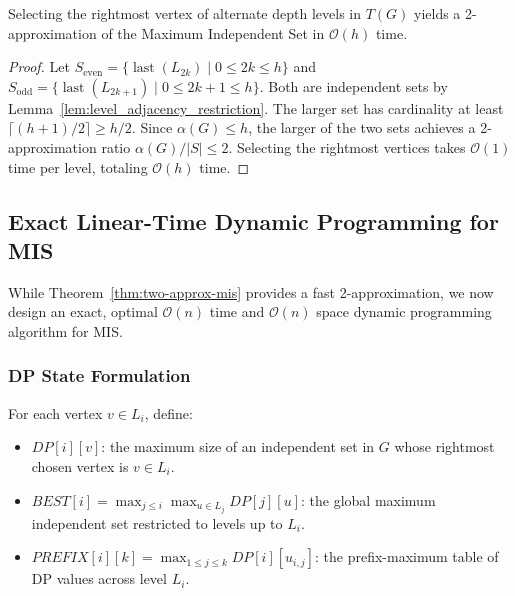 \begin{theorem}
\label{thm:two-approx-mis}
Selecting the rightmost vertex of alternate depth levels in $T(G)$ yields a 2-approximation of the Maximum Independent Set in $\mathcal{O}(h)$ time.
\end{theorem}
\begin{proof}
Let $S_{\text{even}} = \{ \operatorname{last}(L_{2k}) \mid 0 \le 2k \le h \}$ and $S_{\text{odd}} = \{ \operatorname{last}(L_{2k+1}) \mid 0 \le 2k+1 \le h \}$. Both are independent sets by Lemma~\ref{lem:level_adjacency_restriction}. The larger set has cardinality at least $\lceil (h+1)/2 \rceil \ge h/2$. Since $\alpha(G) \le h$, the larger of the two sets achieves a 2-approximation ratio $\alpha(G)/|S| \le 2$. Selecting the rightmost vertices takes $\mathcal{O}(1)$ time per level, totaling $\mathcal{O}(h)$ time.
\end{proof}

\subsection{Exact Linear-Time Dynamic Programming for MIS}

While Theorem~\ref{thm:two-approx-mis} provides a fast 2-approximation, we now design an exact, optimal $\mathcal{O}(n)$ time and $\mathcal{O}(n)$ space dynamic programming algorithm for MIS.

\subsubsection{DP State Formulation}
For each vertex $v \in L_i$, define:
\begin{itemize}
    \item $DP[i][v]$: the maximum size of an independent set in $G$ whose rightmost chosen vertex is $v \in L_i$.
    \item $BEST[i] = \max_{j \le i} \max_{u \in L_j} DP[j][u]$: the global maximum independent set restricted to levels up to $L_i$.
    \item $PREFIX[i][k] = \max_{1 \le j \le k} DP[i][u_{i,j}]$: the prefix-maximum table of DP values across level $L_i$.
\end{itemize}

